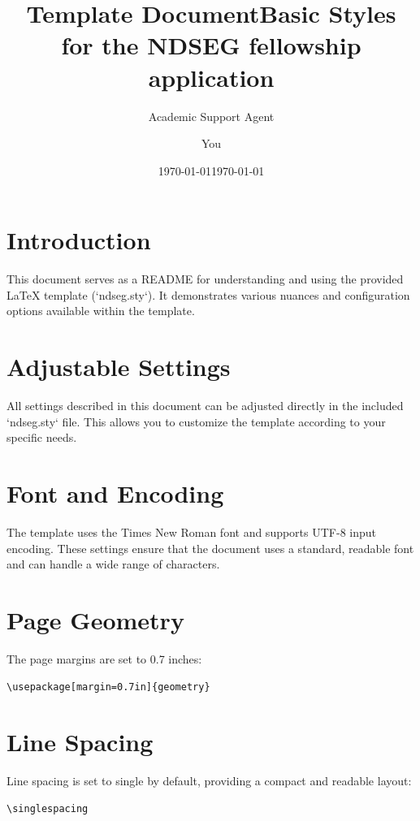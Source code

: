\documentclass{article}
\title{Template Document}
\author{Academic Support Agent}
\date{\today}
\begin{document}
\maketitle

\title{Basic Styles for the NDSEG fellowship application}
\author{You}
\date{\today}
\maketitle

\section{Introduction}
This document serves as a README for understanding and using the provided LaTeX template (`ndseg.sty`). It demonstrates various nuances and configuration options available within the template.

\section{Adjustable Settings}
All settings described in this document can be adjusted directly in the included `ndseg.sty` file. This allows you to customize the template according to your specific needs.

\section{Font and Encoding}
The template uses the Times New Roman font and supports UTF-8 input encoding. These settings ensure that the document uses a standard, readable font and can handle a wide range of characters.

\section{Page Geometry}
The page margins are set to 0.7 inches:
\begin{verbatim}
\usepackage[margin=0.7in]{geometry}
\end{verbatim}

\section{Line Spacing}
Line spacing is set to single by default, providing a compact and readable layout:
\begin{verbatim}
\singlespacing
\end{verbatim}
\end{document}
